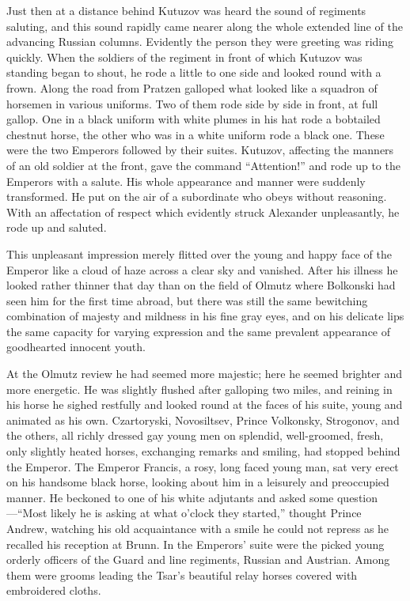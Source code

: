 Just then at a distance behind Kutuzov was heard the sound of
regiments saluting, and this sound rapidly came nearer along the
whole extended line of the advancing Russian columns. Evidently
the person they were greeting was riding quickly. When the
soldiers of the regiment in front of which Kutuzov was standing
began to shout, he rode a little to one side and looked round
with a frown. Along the road from Pratzen galloped what looked
like a squadron of horsemen in various uniforms. Two of them rode
side by side in front, at full gallop. One in a black uniform
with white plumes in his hat rode a bobtailed chestnut horse, the
other who was in a white uniform rode a black one. These were the
two Emperors followed by their suites. Kutuzov, affecting the
manners of an old soldier at the front, gave the command
``Attention!'' and rode up to the Emperors with a salute. His
whole appearance and manner were suddenly transformed. He put on
the air of a subordinate who obeys without reasoning. With an
affectation of respect which evidently struck Alexander
unpleasantly, he rode up and saluted.

This unpleasant impression merely flitted over the young and
happy face of the Emperor like a cloud of haze across a clear sky
and vanished.  After his illness he looked rather thinner that
day than on the field of Olmutz where Bolkonski had seen him for
the first time abroad, but there was still the same bewitching
combination of majesty and mildness in his fine gray eyes, and on
his delicate lips the same capacity for varying expression and
the same prevalent appearance of goodhearted innocent youth.

At the Olmutz review he had seemed more majestic; here he seemed
brighter and more energetic. He was slightly flushed after
galloping two miles, and reining in his horse he sighed restfully
and looked round at the faces of his suite, young and animated as
his own. Czartoryski, Novosiltsev, Prince Volkonsky, Strogonov,
and the others, all richly dressed gay young men on splendid,
well-groomed, fresh, only slightly heated horses, exchanging
remarks and smiling, had stopped behind the Emperor. The Emperor
Francis, a rosy, long faced young man, sat very erect on his
handsome black horse, looking about him in a leisurely and
preoccupied manner. He beckoned to one of his white adjutants and
asked some question---``Most likely he is asking at what o'clock
they started,'' thought Prince Andrew, watching his old
acquaintance with a smile he could not repress as he recalled his
reception at Brunn. In the Emperors' suite were the picked young
orderly officers of the Guard and line regiments, Russian and
Austrian. Among them were grooms leading the Tsar's beautiful
relay horses covered with embroidered cloths.

